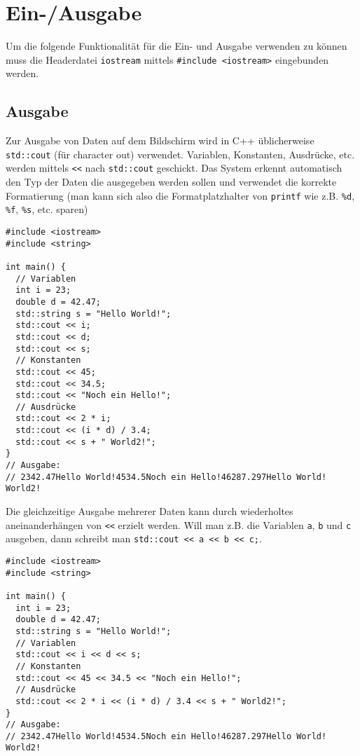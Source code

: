 \documentclass[11pt]{article}
\begin{document}
\section{Ein-/Ausgabe}
\label{sec-5}
Um die folgende Funktionalität für die Ein- und Ausgabe verwenden zu
können muss die Headerdatei \verb~iostream~ mittels \verb~#include <iostream>~
eingebunden werden.
\subsection{Ausgabe}
\label{sec-5-1}
Zur Ausgabe von Daten auf dem Bildschirm wird in C++ üblicherweise
\verb~std::cout~ (für character out) verwendet. Variablen, Konstanten,
Ausdrücke, etc. werden mittels \verb~<<~ nach \verb~std::cout~ geschickt. Das
System erkennt automatisch den Typ der Daten die ausgegeben werden
sollen und verwendet die korrekte Formatierung (man kann sich also die
Formatplatzhalter von \verb~printf~ wie z.B. \verb~%d~, \verb~%f~, \verb~%s~, etc. sparen)

\begin{verbatim}
#include <iostream>
#include <string>

int main() {
  // Variablen
  int i = 23;
  double d = 42.47;
  std::string s = "Hello World!";
  std::cout << i;
  std::cout << d;
  std::cout << s;
  // Konstanten
  std::cout << 45;
  std::cout << 34.5;
  std::cout << "Noch ein Hello!";
  // Ausdrücke
  std::cout << 2 * i;
  std::cout << (i * d) / 3.4;
  std::cout << s + " World2!";
}
// Ausgabe:
// 2342.47Hello World!4534.5Noch ein Hello!46287.297Hello World! World2!
\end{verbatim}

Die gleichzeitige Ausgabe mehrerer Daten kann durch wiederholtes
aneinanderhängen von \verb~<<~ erzielt werden. Will man z.B. die Variablen
\verb~a~, \verb~b~ und \verb~c~ ausgeben, dann schreibt man \verb~std::cout << a << b << c;~.

\begin{verbatim}
#include <iostream>
#include <string>

int main() {
  int i = 23;
  double d = 42.47;
  std::string s = "Hello World!";
  // Variablen
  std::cout << i << d << s;
  // Konstanten
  std::cout << 45 << 34.5 << "Noch ein Hello!";
  // Ausdrücke
  std::cout << 2 * i << (i * d) / 3.4 << s + " World2!";
}
// Ausgabe:
// 2342.47Hello World!4534.5Noch ein Hello!46287.297Hello World! World2!
\end{verbatim}
\end{document}
